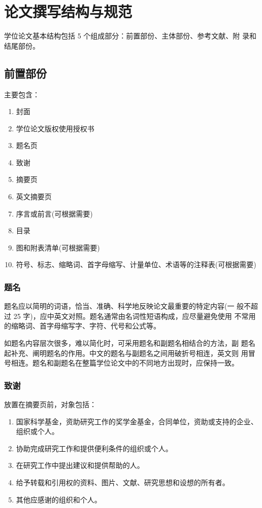 
\chapter{论文撰写结构与规范}
\label{cha:2}

学位论文基本结构包括 5 个组成部分：前置部份、主体部份、参考文献、附
录和结尾部份。

\section{前置部份}
主要包含：
\begin{enumerate}[itemsep=0pt,topsep=2pt,parsep=0pt]
  \item 封面
  \item 学位论文版权使用授权书
  \item 题名页
  \item 致谢
  \item 摘要页
  \item 英文摘要页
  \item 序言或前言(可根据需要)
  \item 目录
  \item 图和附表清单(可根据需要)
  \item 符号、标志、缩略词、首字母缩写、计量单位、术语等的注释表(可根据需要)
\end{enumerate}

\subsection{题名 }

题名应以简明的词语，恰当、准确、科学地反映论文最重要的特定内容(一
般不超过 25 字)，应中英文对照。题名通常由名词性短语构成，应尽量避免使用
不常用的缩略词、首字母缩写字、字符、代号和公式等。 

如题名内容层次很多，难以简化时，可采用题名和副题名相结合的方法，副
题名起补充、阐明题名的作用。中文的题名与副题名之间用破折号相连，英文则
用冒号相连。题名和副题名在整篇学位论文中的不同地方出现时，应保持一致。 

\subsection{致谢}

放置在摘要页前，对象包括：
\begin{enumerate}[itemsep=0pt,topsep=2pt,parsep=0pt]
  \item 国家科学基金，资助研究工作的奖学金基金，合同单位，资助或支持的企业、组织或个人。
  \item 协助完成研究工作和提供便利条件的组织或个人。
  \item 在研究工作中提出建议和提供帮助的人。
  \item 给予转载和引用权的资料、图片、文献、研究思想和设想的所有者。
  \item 其他应感谢的组织和个人。 
\end{enumerate}

